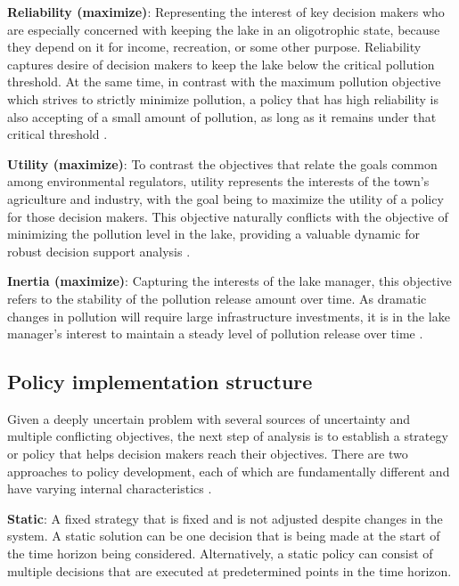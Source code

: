     \textbf{Reliability (maximize)}: Representing the interest of key decision makers who are especially concerned with keeping the lake in an oligotrophic state, because they depend on it for income, recreation, or some other purpose. Reliability captures desire of decision makers to keep the lake below the critical pollution threshold. At the same time, in contrast with the maximum pollution objective which strives to strictly minimize pollution, a policy that has high reliability is also accepting of a small amount of pollution, as long as it remains under that critical threshold \citep{Singh2015}.

    \textbf{Utility (maximize)}: To contrast the objectives that relate the goals common among environmental regulators, utility represents the interests of the town's agriculture and industry, with the goal being to maximize the utility of a policy for those decision makers. This objective naturally conflicts with the objective of minimizing the pollution level in the lake, providing a valuable dynamic for robust decision support analysis \citep{Ward2015}. 
    
    \textbf{Inertia (maximize)}: Capturing the interests of the lake manager, this objective refers to the stability of the pollution release amount over time. As dramatic changes in pollution will require large infrastructure investments, it is in the lake manager's interest to maintain a steady level of pollution release over time \citep{Quinn2017}. 

    \subsection{Policy implementation structure} \label{review-structure}
    Given a deeply uncertain problem with several sources of uncertainty and multiple conflicting objectives, the next step of analysis is to establish a strategy or policy that helps decision makers reach their objectives. There are two approaches to policy development, each of which are fundamentally different and have varying internal characteristics \citep{Maier2016}.
    
    \textbf{Static}: A fixed strategy that is fixed and is not adjusted despite changes in the system. A static solution can be one decision that is being made at the start of the time horizon being considered. Alternatively, a static policy can consist of multiple decisions that are executed at predetermined points in the time horizon.
    
